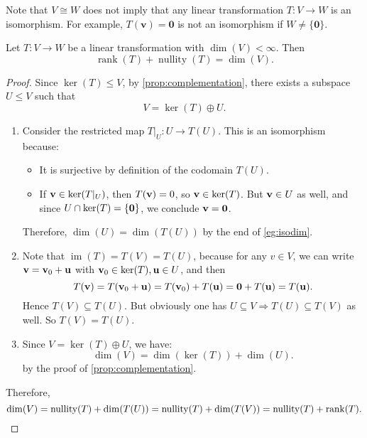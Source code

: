  

\begin{remark}
Note that \(V \cong W\) does not imply that any linear transformation \(T : V \rightarrow W\) is an isomorphism. For example, \(T(\mathbf{v}) = \mathbf{0}\) is not an isomorphism if \(W \neq \{ \mathbf{0} \}\).
\end{remark}


\begin{theorem}
Let \(T : V \rightarrow W\) be a linear transformation with \(\dim(V) < \infty\). Then
\[
\operatorname{rank}(T) + \operatorname{nullity}(T) = \dim(V).
\]
\end{theorem}

\begin{proof}
Since \(\ker(T) \leq V\), by \autoref{prop:complementation}, there exists a subspace \(U \leq V\) such that
\[
V = \ker(T) \oplus U.
\]
\begin{enumerate}
  \item Consider the restricted map \(T|_U : U \rightarrow T(U)\). This is an isomorphism because:
  \begin{itemize}
    \item It is surjective by definition of the codomain \(T(U)\).
    \item If \({\bf v} \in \ker(T|_U)\), then \(T({\bf v}) = 0\), so \({\bf v} \in \ker(T)\). But \({\bf v} \in U\) as well, and since \(U \cap \ker(T) = \{{\bf 0}\}\), we conclude \({\bf v} = {\bf 0}\).
  \end{itemize}
  Therefore, \(\dim(U) = \dim(T(U))\) by the end of \autoref{eg:isodim}.
  
  \item Note that \(\operatorname{im}(T) = T(V) = T(U)\), because for any \(v \in V\), we can write \({\bf v} = {\bf v}_0 + {\bf u}\) with \({\bf v}_0 \in \ker(T), {\bf u} \in U\), and then
  \[
  T({\bf v}) = T({\bf v}_0 + {\bf u}) = T({\bf v}_0) + T({\bf u}) = {\bf 0} + T({\bf u}) = T({\bf u}).
  \]
  Hence \(T(V) \subseteq T(U)\). But obviously one has $U \subseteq V \Rightarrow T(U) \subseteq T(V)$ as well. So $T(V) = T(U)$.
  
  \item Since \(V = \ker(T) \oplus U\), we have:
  \[
  \dim(V) = \dim(\ker(T)) + \dim(U).
  \]
  by the proof of \autoref{prop:complementation}.
\end{enumerate}

Therefore,
\[
\dim(V) = \operatorname{nullity}(T) + \dim(T(U)) = \operatorname{nullity}(T) + \dim(T(V)) = \operatorname{nullity}(T) + \operatorname{rank}(T). \qedhere
\]
\end{proof}